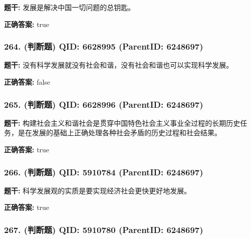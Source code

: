\documentclass[12pt,UTF8]{ctexart}
\begin{document}
\textbf{题干:}
发展是解决中国一切问题的总钥匙。



\textbf{正确答案:}
true

\vspace{0.3em}\hrulefill\vspace{0.7em}

\subsubsection*{264. (判断题) \small QID: 6628995 (ParentID: 6248697)}

\textbf{题干:}
没有科学发展就没有社会和谐，没有社会和谐也可以实现科学发展。



\textbf{正确答案:}
false

\vspace{0.3em}\hrulefill\vspace{0.7em}

\subsubsection*{265. (判断题) \small QID: 6628996 (ParentID: 6248697)}

\textbf{题干:}
构建社会主义和谐社会是贯穿中国特色社会主义事业全过程的长期历史任务，是在发展的基础上正确处理各种社会矛盾的历史过程和社会结果。



\textbf{正确答案:}
true

\vspace{0.3em}\hrulefill\vspace{0.7em}

\subsubsection*{266. (判断题) \small QID: 5910784 (ParentID: 6248697)}

\textbf{题干:}
科学发展观的实质是要实现经济社会更快更好地发展。



\textbf{正确答案:}
true

\vspace{0.3em}\hrulefill\vspace{0.7em}

\subsubsection*{267. (判断题) \small QID: 5910780 (ParentID: 6248697)}
\end{document}
